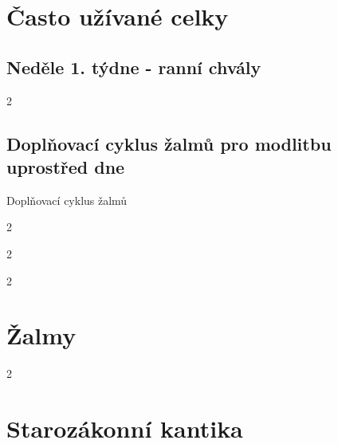 \documentclass[a5paper, twoside]{article}
\newenvironment{hora}{
  \begin{multicols}{2}
}{
  \end{multicols}
}
\begin{document}
\clearpage

\section{Často užívané celky}

\subsection{Neděle 1. týdne - ranní chvály}

\ranniChvaly
\begin{hora}
\label{zalmyne1trch}



\end{hora}

\subsection{Doplňovací cyklus žalmů pro modlitbu uprostřed dne}{Doplňovací cyklus žalmů}

\label{zalmydoplncyklus}
\begin{hora}



\end{hora}

\begin{hora}



\end{hora}

\begin{hora}



\end{hora}

\section{Žalmy}

\begin{hora}

\end{hora}

\section{Starozákonní kantika}
\end{document}
